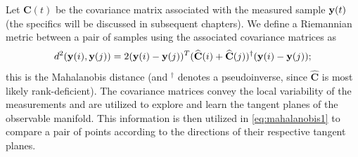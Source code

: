 Let $\mathbf{C}(t)$ be the covariance matrix associated with the measured sample $\mathbf{y}(t)$ (the specifics will be discussed in subsequent chapters). 
%
We define a Riemannian metric between a pair of samples using the associated covariance matrices as
\begin{equation}
	d^2(\mathbf{y}(i), \mathbf{y}(j)) = 2 (\mathbf{y}(i) - \mathbf{y}(j))^T(\widehat{\mathbf{C}}(i) + \widehat{\mathbf{C}}(j))^{\dagger}(\mathbf{y}(i) - \mathbf{y}(j));
	\label{eq:mahalanobis1}
\end{equation}
this is the Mahalanobis distance (and $^{\dagger}$ denotes a pseudoinverse, since $\widehat{\mathbf{C}}$ is most likely rank-deficient).
%
The covariance matrices convey the local variability of the measurements and are utilized to explore and learn the tangent planes of the observable manifold.
%
This information is then utilized in \eqref{eq:mahalanobis1} to compare a pair of points according to the directions of their respective tangent planes.
%
